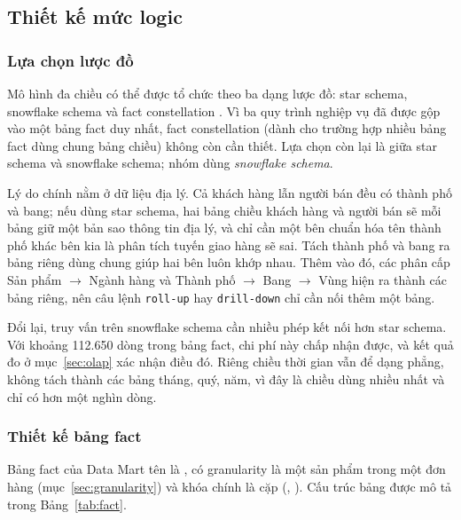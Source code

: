 \subsection{Thiết kế mức logic}

\subsubsection{Lựa chọn lược đồ}\label{sec:luocdo}

Mô hình đa chiều có thể được tổ chức theo ba dạng lược đồ: star schema, snowflake schema và fact constellation \cite{han}. Vì ba quy trình nghiệp vụ đã được gộp vào một bảng fact duy nhất, fact constellation (dành cho trường hợp nhiều bảng fact dùng chung bảng chiều) không còn cần thiết. Lựa chọn còn lại là giữa star schema và snowflake schema; nhóm dùng \textit{snowflake schema}.

Lý do chính nằm ở dữ liệu địa lý. Cả khách hàng lẫn người bán đều có thành phố và bang; nếu dùng star schema, hai bảng chiều khách hàng và người bán sẽ mỗi bảng giữ một bản sao thông tin địa lý, và chỉ cần một bên chuẩn hóa tên thành phố khác bên kia là phân tích tuyến giao hàng sẽ sai. Tách thành phố và bang ra bảng riêng dùng chung giúp hai bên luôn khớp nhau. Thêm vào đó, các phân cấp Sản phẩm $\rightarrow$ Ngành hàng và Thành phố $\rightarrow$ Bang $\rightarrow$ Vùng hiện ra thành các bảng riêng, nên câu lệnh \texttt{roll-up} hay \texttt{drill-down} chỉ cần nối thêm một bảng.

Đổi lại, truy vấn trên snowflake schema cần nhiều phép kết nối hơn star schema. Với khoảng 112.650 dòng trong bảng fact, chi phí này chấp nhận được, và kết quả đo ở mục~\ref{sec:olap} xác nhận điều đó. Riêng chiều thời gian vẫn để dạng phẳng, không tách thành các bảng tháng, quý, năm, vì đây là chiều dùng nhiều nhất và chỉ có hơn một nghìn dòng.

\subsubsection{Thiết kế bảng fact}

Bảng fact của Data Mart tên là , có granularity là một sản phẩm trong một đơn hàng (mục~\ref{sec:granularity}) và khóa chính là cặp (, ). Cấu trúc bảng được mô tả trong Bảng~\ref{tab:fact}.

